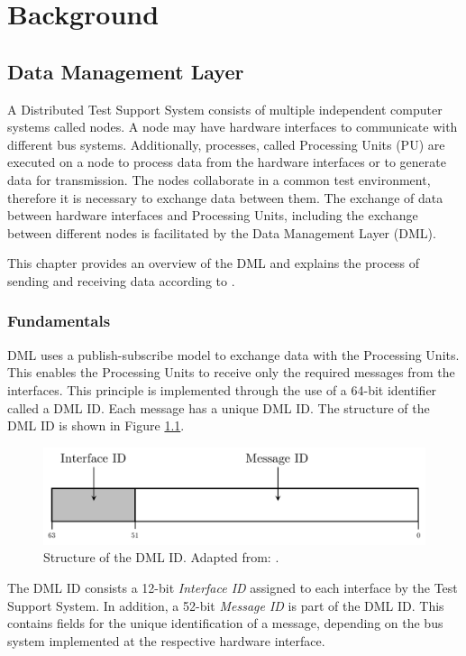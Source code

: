 
\chapter{Background}

\section{Data Management Layer}
A Distributed Test Support System consists of multiple independent computer systems called nodes. A node may have hardware interfaces to communicate with different bus systems. Additionally, processes, called Processing Units (PU) are executed on a node to process data from the hardware interfaces or to generate data for transmission. The nodes collaborate in a common test environment, therefore it is necessary to exchange data between them. The exchange of data between hardware interfaces and Processing Units, including the exchange between different nodes is facilitated by the Data Management Layer (DML).

This chapter provides an overview of the DML and explains the process of sending and receiving data according to \cite{dml01}.

\subsection{Fundamentals}
DML uses a publish-subscribe model to exchange data with the Processing Units. This enables the Processing Units to receive only the required messages from the interfaces. This principle is implemented through the use of a 64-bit identifier called a DML ID. Each message has a unique DML ID.  The structure of the DML ID is shown in Figure \ref{fig:DmlId}.

\begin{figure}[h!]
    \centering
    \includegraphics[width=0.8\linewidth]{figures/dml/dml01.pdf}
    \caption[Structure of the DML ID]{Structure of the DML ID. Adapted from: \cite{dml01}.}
    \label{fig:DmlId}
\end{figure}

The DML ID consists a 12-bit \textit{Interface ID} assigned to each interface by the Test Support System. In addition, a 52-bit \textit{Message ID} is part of the DML ID. This contains fields for the unique identification of a message, depending on the bus system implemented at the respective hardware interface.

